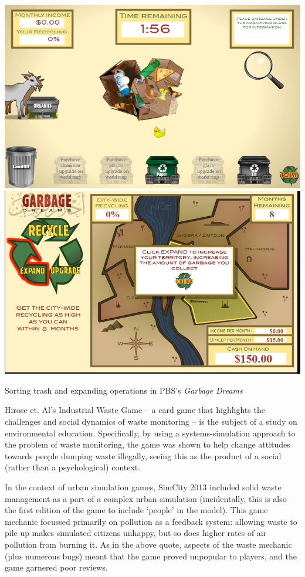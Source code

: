 \documentclass[nofonts,nols,justified,nobib]{tufte-book}
\begin{document}
\begin{marginfigure}
\includegraphics[width=\textwidth]{img/1/garbage-dreams-1.png}
\includegraphics[width=\textwidth]{img/1/garbage-dreams-2.png}
\caption{Sorting trash and expanding operations in PBS's \emph{Garbage Dreams} \cite{iskander_garbage_2011} \label{b}}
\end{marginfigure}


Hirose et. Al's Industrial Waste Game \cite{hirose_industrial_2004} -- a card game that highlights the challenges and social dynamics of waste monitoring -- is the subject of a study on environmental education. Specifically, by using a systems-simulation approach to the problem of waste monitoring, the game was shown to help change attitudes towards people dumping waste illegally, seeing this as the product of a social (rather than a psychological) context. 

In the context of urban simulation games, SimCity 2013 included solid waste management as a part of a complex urban simulation (incidentally, this is also the first edition of the game to include `people' in the model). This game mechanic focussed primarily on pollution as a feedback system: allowing waste to pile up makes simulated citizens unhappy, but so does higher rates of air pollution from burning it. As in the above quote, aspects of the waste mechanic (plus numerous bugs) meant that the game proved unpopular to players, and the game garnered poor reviews.  
\end{document}
